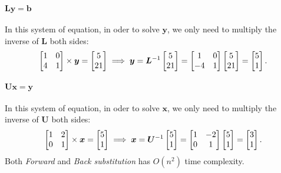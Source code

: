 \begin{enumerate}
\begin{example}
\paragraph{$\bm{Ly}=\bm b$} In this system of equation, in oder to solve
$\bm y$, we only need to multiply the inverse of $\bm L$ both sides:
\[
\begin{bmatrix}
1&0\\4&1
\end{bmatrix}\times\bm y=\begin{bmatrix}
5\\21
\end{bmatrix}\implies
\bm y=\bm L^{-1}\begin{bmatrix}
5\\21
\end{bmatrix}=\begin{bmatrix}
1&0\\-4&1
\end{bmatrix}\begin{bmatrix}
5\\21
\end{bmatrix}=\begin{bmatrix}
5\\1
\end{bmatrix}.
\]
\paragraph{$\bm{Ux}=\bm y$} In this system of equation, in oder to solve
$\bm x$, we only need to multiply the inverse of $\bm U$ both sides:
\[
\begin{bmatrix}
1&2\\0&1
\end{bmatrix}\times\bm x=\begin{bmatrix}
5\\1
\end{bmatrix}\implies
\bm x=\bm U^{-1}\begin{bmatrix}
5\\1
\end{bmatrix}=\begin{bmatrix}
1&-2\\0&1
\end{bmatrix}\begin{bmatrix}
5\\1
\end{bmatrix}=\begin{bmatrix}
3\\1
\end{bmatrix}.
\]
Both \emph{Forward} and \emph{Back substitution} has $O(n^2)$ time complexity.
\end{example}
\end{enumerate}
